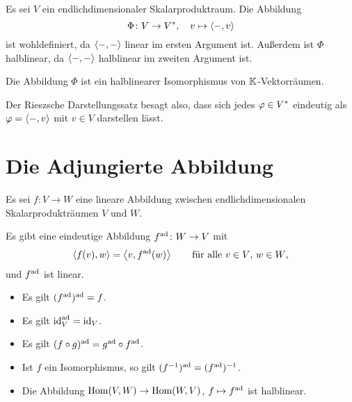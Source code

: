 Es sei $V$ ein endlichdimensionaler Skalarproduktraum.
Die Abbildung
\[
          \Phi
  \colon  V
  \to     V^*,
  \quad   v
  \mapsto \left\langle -, v \right\rangle
\]
ist wohldefiniert, da $\left\langle -, - \right\rangle$ linear im ersten Argument ist.
Außerdem ist $\Phi$ halblinear, da $\left\langle -, - \right\rangle$ halblinear im zweiten Argument ist.

\begin{theorem}
  \label{theorem: Riesz representation theorem}
  Die Abbildung $\Phi$ ist ein halblinearer Isomorphismus von $\mathbb{K}$-Vektorräumen.
\end{theorem}

Der Rieszsche Darstellungssatz besagt also, dass sich jedes $\varphi \in V^*$ eindeutig als $\varphi = \left\langle -, v \right\rangle$ mit $v \in V$ darstellen lässt.





\section{Die Adjungierte Abbildung}
\label{section: adjoint map for scalar products}

Es sei $f \colon V \to W$ eine lineare Abbildung zwischen endlichdimensionalen Skalarprodukträumen $V$ und $W$.

\begin{proposition}
  Es gibt eine eindeutige Abbildung $f^{\operatorname{ad}} \colon W \to V$ mit
  \begin{equation}
    \label{equation: definition of the adjoint map by elements for scalar products}
      \left\langle f(v), w \right\rangle
    = \left\langle v, f^{\operatorname{ad}}(w) \right\rangle
    \qquad
    \text{für alle $v \in V$, $w \in W$},
  \end{equation}
  und $f^{\operatorname{ad}}$ ist linear.
\end{proposition}

\begin{lemma}
  \leavevmode
  \begin{itemize}
    \item
      Es gilt $(f^{\operatorname{ad}})^{\operatorname{ad}} = f$.
    \item
      Es gilt $\operatorname{id}_V^{\operatorname{ad}} = \operatorname{id}_V$.
    \item
      Es gilt $(f \circ g)^{\operatorname{ad}} = g^{\operatorname{ad}} \circ f^{\operatorname{ad}}$.
    \item
      Ist $f$ ein Isomorphismus, so gilt $(f^{-1})^{\operatorname{ad}} = (f^{\operatorname{ad}})^{-1}$.
    \item
      Die Abbildung $\operatorname{Hom}(V, W) \to \operatorname{Hom}(W, V)$, $f \mapsto f^{\operatorname{ad}}$ ist halblinear.
  \end{itemize}
\end{lemma}

